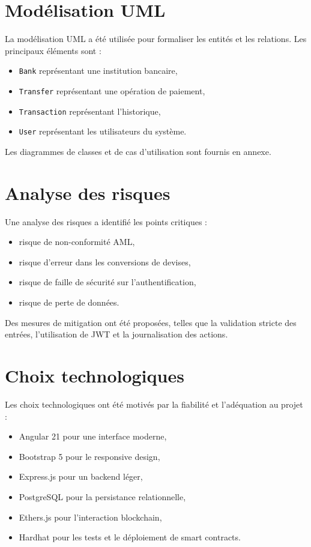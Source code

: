 \documentclass[a4paper,12pt]{report}
\begin{document}
\section{Modélisation UML}
La modélisation UML a été utilisée pour formaliser les entités et les relations. Les principaux éléments sont :\
\begin{itemize}[leftmargin=*,nosep]
  \item \texttt{Bank} représentant une institution bancaire,
  \item \texttt{Transfer} représentant une opération de paiement,
  \item \texttt{Transaction} représentant l'historique,
  \item \texttt{User} représentant les utilisateurs du système.
\end{itemize}
Les diagrammes de classes et de cas d'utilisation sont fournis en annexe.

\section{Analyse des risques}
Une analyse des risques a identifié les points critiques :
\begin{itemize}[leftmargin=*,nosep]
  \item risque de non-conformité AML,
  \item risque d'erreur dans les conversions de devises,
  \item risque de faille de sécurité sur l'authentification,
  \item risque de perte de données.
\end{itemize}
Des mesures de mitigation ont été proposées, telles que la validation stricte des entrées, l'utilisation de JWT et la journalisation des actions.

\section{Choix technologiques}
Les choix technologiques ont été motivés par la fiabilité et l'adéquation au projet :
\begin{itemize}[leftmargin=*,nosep]
  \item Angular 21 pour une interface moderne,
  \item Bootstrap 5 pour le responsive design,
  \item Express.js pour un backend léger,
  \item PostgreSQL pour la persistance relationnelle,
  \item Ethers.js pour l'interaction blockchain,
  \item Hardhat pour les tests et le déploiement de smart contracts.
\end{itemize}
\end{document}
